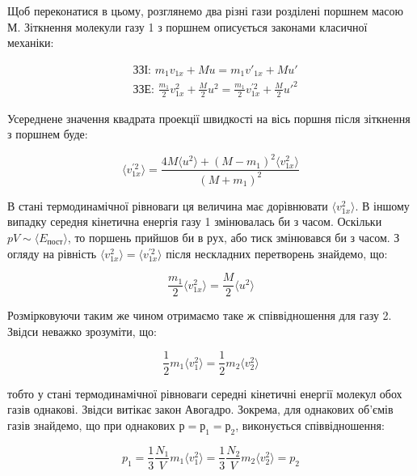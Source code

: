 Щоб переконатися в цьому, розглянемо два різні гази розділені поршнем масою $М$. Зіткнення молекули
газу 1 з поршнем описується законами класичної механіки:

\begin{align}
&\text{ЗЗІ: } m_{1}v_{1x} + Mu = m_{1}v'_{1x} + Mu' \label{eq:momentum_conservation} \\
&\text{ЗЗЕ: } \frac{m_{1}}{2}v_{1x}^{2} + \frac{M}{2}u^{2} = \frac{m_{1}}{2}v_{1x}^{'2} +
\frac{M}{2}u'^{2} \label{eq:energy_conservation}
\end{align}

Усереднене значення квадрата проекції швидкості на вісь поршня після зіткнення з поршнем буде:

\begin{equation}\label{eq:velocity_after_collision}
\langle v_{1x}^{'2} \rangle = \frac{4M\langle u^{2} \rangle + (M - m_{1})^{2}\langle v_{1x}^{2}
\rangle}{(M + m_{1})^{2}}
\end{equation}

В стані термодинамічної рівноваги ця величина має дорівнювати $\langle v_{1x}^{2} \rangle$. В іншому
випадку середня кінетична енергія газу 1 змінювалась би з часом. Оскільки $pV \sim \langle
E_{\text{пост}} \rangle$, то поршень прийшов би в рух, або тиск змінювався би з часом. З огляду на
рівність $\langle v_{1x}^{2} \rangle = \langle v_{1x}^{'2} \rangle$ після нескладних перетворень
знайдемо, що:

\begin{equation}\label{eq:energy_equality}
\frac{m_{1}}{2}\langle v_{1x}^{2} \rangle = \frac{M}{2}\langle u^{2} \rangle
\end{equation}

Розмірковуючи таким же чином отримаємо таке ж співвідношення для газу 2. Звідси неважко зрозуміти, що:

\begin{equation}\label{eq:energy_equality_gases}
\frac{1}{2}m_{1}\langle v_{1}^{2} \rangle = \frac{1}{2}m_{2}\langle v_{2}^{2} \rangle
\end{equation}

тобто у стані термодинамічної рівноваги середні кінетичні енергії молекул обох газів однакові. Звідси
витікає закон Авогадро. Зокрема, для однакових об'ємів газів знайдемо, що при однакових $р = р_1 =
р_2$, виконується співвідношення:

\begin{equation}\label{eq:avogadro_law}
p_{1} = \frac{1}{3}\frac{N_{1}}{V}m_{1}\langle v_{1}^{2} \rangle =
\frac{1}{3}\frac{N_{2}}{V}m_{2}\langle v_{2}^{2} \rangle = p_{2}
\end{equation}

